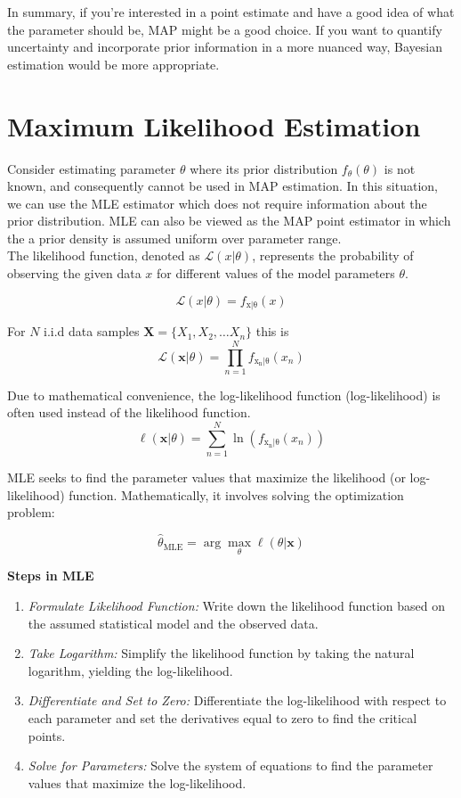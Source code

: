 \documentclass[12pt]{book}
\theoremstyle{definition}
\begin{document}
In summary, if you're interested in a point estimate and have a good idea of what the parameter should be, MAP might be a good choice. If you want to quantify uncertainty and incorporate prior information in a more nuanced way, Bayesian estimation would be more appropriate.

\section{Maximum Likelihood Estimation}
Consider estimating parameter \(\theta\) where its prior distribution \(f_\theta (\theta)\) is not known, and consequently cannot be used in MAP estimation. In this situation, we can use the MLE estimator which does not require information about the prior distribution. MLE can also be viewed as the MAP point estimator in which the a prior density is assumed uniform over parameter range.\\



The likelihood function, denoted as \( \mathcal{L}( x | \theta ) \), represents the probability of observing the given data \( x \) for different values of the model parameters \( \theta \).

\[
\mathcal{L}(x| \theta) = f_\mathrm{x|\theta}(x)
\]

For \(N\) i.i.d data samples \(\mathbf{X} = \{X_1, X_2, \ldots X_n \} \) this is 
\[
\mathcal{L}(\mathbf{x} | \theta ) = \prod_{n=1}^N f_\mathrm{x_n|\theta}(x_n)
\]

Due to mathematical convenience, the log-likelihood function (log-likelihood) is often used instead of the likelihood function.
 \[
 \ell(\mathbf{x} | \theta ) =  \sum_{n=1}^N \ln \left (f_\mathrm{x_n|\theta}(x_n) \right )\]

MLE seeks to find the parameter values that maximize the likelihood (or log-likelihood) function. Mathematically, it involves solving the optimization problem: 

\[ \hat{\theta}_{\text{MLE}} = \arg\max_{\theta} \ell(\theta | \mathbf{x}) 
\]

\textbf{Steps in MLE}\\

\begin{enumerate}
    \item \emph{Formulate Likelihood Function:} Write down the likelihood function based on the assumed statistical model and the observed data.
    \item \emph{Take Logarithm:} Simplify the likelihood function by taking the natural logarithm, yielding the log-likelihood.
    \item \emph{Differentiate and Set to Zero: } Differentiate the log-likelihood with respect to each parameter and set the derivatives equal to zero to find the critical points.
    \item \emph{Solve for Parameters:} Solve the system of equations to find the parameter values that maximize the log-likelihood.

\end{enumerate}
\end{document}

